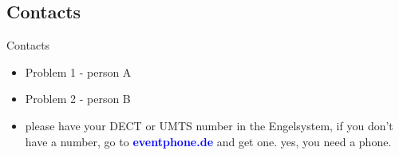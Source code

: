 \documentclass[hyperref={pdfpagelabels=false}]{beamer}
\begin{document}
\subsection{Contacts}
\begin{frame}{Contacts}
\begin{itemize}
\item  Problem 1 - person A
\item  Problem 2 - person B
\item  please have your DECT or UMTS number in the Engelsystem, if you don't have a number, go to 
\textcolor{blue}{\textbf{eventphone.de}} and get one. yes, you need a phone.
\end{itemize} 
\end{frame}

\end{document}
